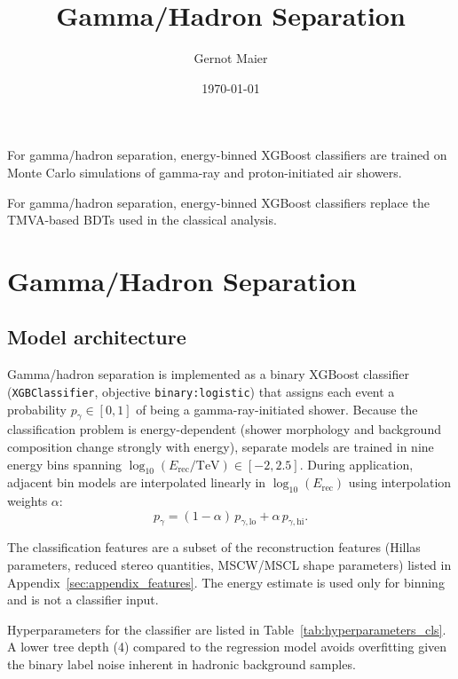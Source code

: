 \documentclass[12pt]{article}
\title{Gamma/Hadron Separation}
\author{Gernot Maier}
\date{\today}
\begin{document}
\maketitle

For gamma/hadron separation, energy-binned XGBoost classifiers are trained on
Monte Carlo simulations of gamma-ray and proton-initiated air showers.

For gamma/hadron separation, energy-binned XGBoost classifiers replace the
TMVA-based BDTs used in the classical analysis.

\section{Gamma/Hadron Separation}
\label{sec:classification}

\subsection{Model architecture}

Gamma/hadron separation is implemented as a binary XGBoost classifier
(\texttt{XGBClassifier}, objective \texttt{binary:logistic})
that assigns each event a probability $p_\gamma \in [0,1]$ of being
a gamma-ray-initiated shower.
Because the classification problem is energy-dependent (shower morphology and
background composition change strongly with energy), separate models are trained
in nine energy bins spanning $\log_{10}(E_\mathrm{rec}/\mathrm{TeV}) \in [-2, 2.5]$.
During application, adjacent bin models are interpolated linearly in
$\log_{10}(E_\mathrm{rec})$ using interpolation weights $\alpha$:
\begin{equation}
  p_\gamma = (1 - \alpha)\, p_{\gamma,\mathrm{lo}} + \alpha\, p_{\gamma,\mathrm{hi}}.
\end{equation}

The classification features are a subset of the reconstruction features
(Hillas parameters, reduced stereo quantities, MSCW/MSCL shape parameters)
listed in Appendix~\ref{sec:appendix_features}.
The energy estimate is used only for binning and is not a classifier input.

Hyperparameters for the classifier are listed in Table~\ref{tab:hyperparameters_cls}.
A lower tree depth (4) compared to the regression model avoids overfitting given the
binary label noise inherent in hadronic background samples.
\end{document}
